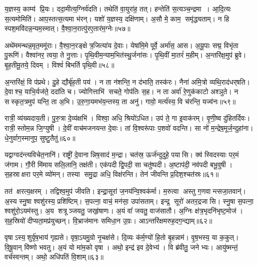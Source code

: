 य॒ज्ञस्य॒ काम्य॑ प्रि॒यः।
ददा॒मीत्य॒ग्निर्व॑दति।
तथेति॑ वा॒युरा॑ह॒ तत्।
हन्तेति॑ स॒त्यञ्च॒न्द्रमा।
आ॒दि॒त्यः स॒त्यमोमिति॑।
आप॒स्तत्स॒त्यमा भ॑रन्।
यशो॑ य॒ज्ञस्य॒ दक्षि॑णाम्।
अ॒सौ मे॒ काम॒ समृ॑द्ध्यताम्।
न हि स्पश॒मवि॑दन्न॒न्यम॒स्मात्।
वै॒श्वा॒न॒रात्पु॑रए॒तार॑म॒ग्नेः॥५७॥

अथे॑ममन्थन्न॒मृत॒ममू॑राः।
वै॒श्वा॒न॒रङ्क्षेत्र॒जित्या॑य दे॒वाः।
येषा॑मि॒मे पूर्वे॒ अर्मा॑स॒ आस\sn{}।
अ॒यू॒पाः सद्म॒ विभृ॑ता पु॒रूणि॑।
वैश्वा॑नर॒ त्वया॒ ते नु॒त्ताः।
पृ॒थि॒वीम॒न्याम॒भित॑स्थु॒र्जना॑सः।
पृ॒थि॒वीं मा॒तरं॑ म॒हीम्।
अ॒न्तरि॑क्ष॒मुप॑ ब्रुवे।
बृ॒ह॒तीमू॒तये॒ दिवम्।
विश्वं॑ बिभर्ति पृथि॒वी॥५८॥

अ॒न्तरि॑क्षं॒ वि प॑प्रथे।
दु॒हे द्यौर्बृ॑ह॒ती पय॑।
न ता न॑शन्ति॒ न द॑भाति॒ तस्क॑रः।
नैना॑ अमि॒त्रो व्यथि॒राद॑धर्‌षति।
दे॒वाश्च॒ याभि॒र्यज॑ते॒ ददा॑ति च।
ज्योगित्ताभि॑ सचते॒ गोप॑तिः स॒ह।
न ता अर्वा॑ रे॒णुक॑काटो अश्ञुते।
न सस्कृत॒त्रमुप॑ यन्ति॒ ता अ॒भि।
उ॒रु॒गा॒यमभ॑य॒न्तस्य॒ ता अनु॑।
गावो॒ मर्त्य॑स्य॒ वि च॑रन्ति॒ यज्व॑नः॥५९॥

रात्री॒ व्य॑ख्यदाय॒ती।
पु॒रु॒त्रा दे॒व्य॑क्षभि॑।
विश्वा॒ अधि॒ श्रियो॑ऽधित।
उप॑ ते॒ गा इ॒वाक॑रम्।
वृ॒णी॒ष्व दु॑हितर्दिवः।
रात्री॒ स्तोम॒न्न जि॒ग्युषी।
दे॒वीं वाच॑मजनयन्त दे॒वाः।
तां वि॒श्वरू॑पाः प॒शवो॑ वदन्ति।
सा नो॑ म॒न्द्रेष॒मूर्ज॒न्दुहा॑ना।
धे॒नुर्वाग॒स्मानुप॒ सुष्टु॒तैतु॑॥६०॥

यद्वाग्वद॑न्त्यविचेत॒नानि॑।
राष्ट्री॑ दे॒वानान्निष॒साद॑ म॒न्द्रा।
चत॑स्र॒ ऊर्ज॑न्दुदुहे॒ पयासि।
क्व॑ स्विदस्याः पर॒मं ज॑गाम।
गौ॒री मि॑माय सलि॒लानि॒ तक्ष॑ती।
एक॑पदी द्वि॒पदी॒ सा चतु॑ष्पदी।
अ॒ष्टाप॑दी॒ नव॑पदी बभू॒वुषी।
स॒हस्राक्षरा पर॒मे व्यो॑मन्।
तस्या समु॒द्रा अधि॒ विक्ष॑रन्ति।
तेन॑ जीवन्ति प्र॒दिश॒श्चत॑स्रः॥६१॥

तत॑ क्षरत्य॒क्षरम्।
तद्विश्व॒मुप॑ जीवति।
इन्द्रा॒सूरा॑ ज॒नय॑न्वि॒श्वक॑र्मा।
म॒रुत्वा अस्तु ग॒णवान्त्सजा॒तवान्॑।
अ॒स्य स्नु॒षा श्वशु॑रस्य॒ प्रशि॑ष्टिम्।
स॒पत्ना॒ वाचं॒ मन॑सा॒ उपा॑सताम्।
इन्द्र॒ सूरो॑ अतर॒द्रजासि।
स्नु॒षा स॒पत्ना॒ श्वशु॑रो॒ऽयम॑स्तु।
अ॒य शत्रूञ्जयतु॒ जर्‌हृ॑षाणः।
अ॒यं वां॑ जयतु॒ वाज॑सातौ।
अ॒ग्निः क्ष॑त्र॒भृदनि॑भृष्ट॒मोज॑।
स॒ह॒स्रियो॑ दीप्यता॒मप्र॑युच्छन्।
वि॒भ्राज॑मानः समिधा॒न उ॒ग्रः।
आऽन्तरि॑क्षमरुह॒दग॒न्द्याम्॥६२॥\anuvakamend[धा॒रय॑न्पुरो॒डाशं॒ बृह॒स्पतिं॑ ज॒घन॑च्युतिमान॒न्दो भग॑स्य तृप्याण्य॒ग्नेः पृ॑थि॒वी यज्व॑न एतु प्र॒दिश॒श्चत॑स्रो॒ वाज॑सातौ च॒त्वारि॑ च]

वृषाऽस्य॒शुर्वृ॑ष॒भाय॑ गृह्यसे।
वृषा॒ऽयमु॒ग्रो नृ॒चक्ष॑से।
दि॒व्यः क॑र्म॒ण्यो॑ हि॒तो बृ॒हन्नाम॑।
वृ॒ष॒भस्य॒ या क॒कुत्।
वि॒षू॒वान् वि॑ष्णो भवतु।
अ॒यं यो मा॑म॒को वृषा।
अथो॒ इन्द्र॑ इव दे॒वेभ्य॑।
वि ब्र॑वीतु॒ जनेभ्यः।
आयु॑ष्मन्तं॒ वर्च॑स्वन्तम्।
अथो॒ अधि॑पतिं वि॒शाम्॥६३॥

